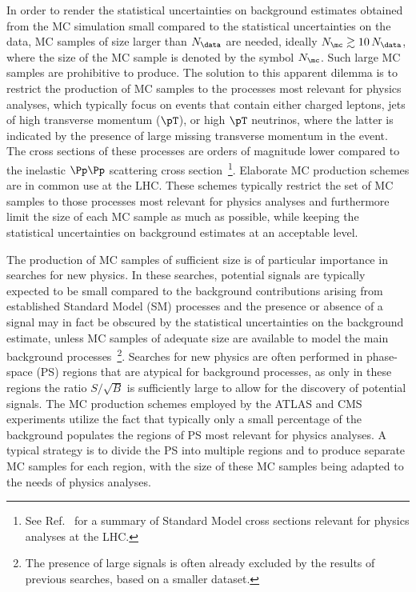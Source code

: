 In order to render the statistical uncertainties on background estimates obtained from the MC simulation small compared to the statistical uncertainties on the data,
MC samples of size larger than $N_{\data}$ are needed, ideally $N_{\mc} \gtrsim 10 \, N_{\data}$,
where the size of the MC sample is denoted by the symbol $N_{\mc}$.
Such large MC samples are prohibitive to produce.
The solution to this apparent dilemma is to restrict the production of MC samples to the processes most relevant for physics analyses,
which typically focus on events that contain either charged leptons, jets of high transverse momentum ($\pT$), or high $\pT$ neutrinos,
where the latter is indicated by the presence of large missing transverse momentum in the event.
The cross sections of these processes are orders of magnitude lower compared to the inelastic $\Pp\Pp$ scattering cross section~\footnote{ 
See Ref.~\cite{StandardModelCrossSections} for a summary of Standard Model cross sections relevant for physics analyses at the LHC.}.
Elaborate MC production schemes are in common use at the LHC.
These schemes typically restrict the set of MC samples to those processes most relevant for physics analyses
and furthermore limit the size of each MC sample as much as possible, 
while keeping the statistical uncertainties on background estimates at an acceptable level.

The production of MC samples of sufficient size is of particular importance in searches for new physics.
In these searches, potential signals are typically expected to be small
compared to the background contributions arising from established Standard Model (SM) processes
and the presence or absence of a signal may in fact be obscured by the statistical uncertainties on the background estimate,
unless MC samples of adequate size are available to model the main background processes~\footnote{
The presence of large signals is often already excluded by the results of previous searches, based on a smaller dataset.}.
Searches for new physics are often performed in phase-space (PS) regions that are atypical for background processes,
as only in these regions the ratio $S/\sqrt{B}$ is sufficiently large to allow for the discovery of potential signals.
The MC production schemes employed by the ATLAS and CMS experiments utilize the fact 
that typically only a small percentage of the background populates the regions of PS most relevant for physics analyses.
A typical strategy is to divide the PS into multiple regions and to produce separate MC samples for each region,
with the size of these MC samples being adapted to the needs of physics analyses.

